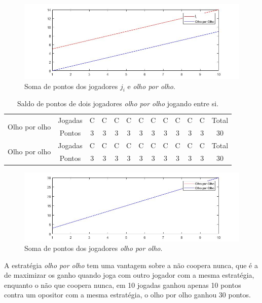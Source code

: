 \begin{figure}[H]
\centering
\includegraphics[width=14cm]{imagens/graf7.jpg}
\caption{Soma de pontos dos jogadores $j_i$ e \textit{olho por olho}.}
\label{fig7}
\end{figure}

\begin{table}[H]
\centering
\begin{tabular}{|c|c|c|c|c|c|c|c|c|c|c|c|c|}\hline
\multirow{2}{*}{Olho por olho} & Jogadas & C & C & C & C & C & C & C & C & C & C & Total\\\cline{2-12}
 & Pontos & 3 & 3 & 3 & 3 & 3 & 3 & 3 & 3 & 3 & 3 & 30\\\hline\hline
\multirow{2}{*}{Olho por olho} & Jogadas & C & C & C & C & C & C & C & C & C & C & Total\\\cline{2-12}
 & Pontos & 3 & 3 & 3 & 3 & 3 & 3 & 3 & 3 & 3 & 3 & 30\\\hline
\end{tabular}
\caption{Saldo de pontos de dois jogadores \textit{olho por olho} jogando entre si.}
\label{tab8}
\end{table}

\begin{figure}[H]
\centering
\includegraphics[width=14cm]{imagens/graf8.jpg}
\caption{Soma de pontos dos jogadores \textit{olho por olho}.}
\label{fig8}
\end{figure}

A estratégia \textit{olho por olho} tem uma vantagem sobre a não coopera nunca, que é a de maximizar os ganho quando joga com outro jogador com a mesma estratégia, enquanto o não que coopera nunca, em 10 jogadas ganhou apenas 10 pontos contra um opositor com a mesma estratégia, o olho por olho ganhou 30 pontos.

